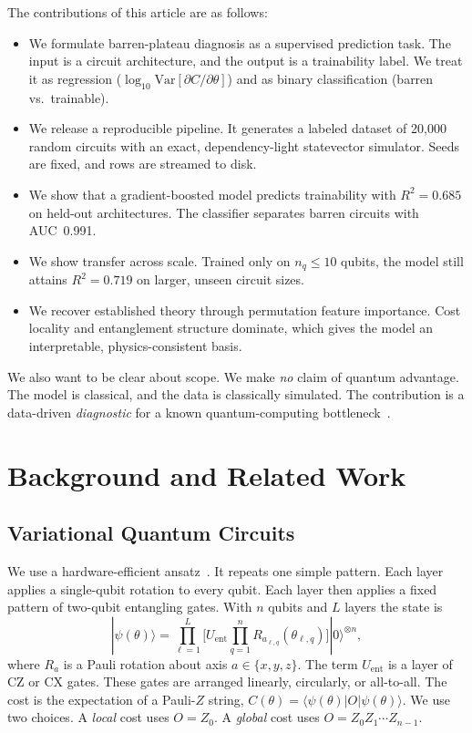 \documentclass[quantumrep,article,submit,pdftex,oneauthor]{Definitions/mdpi}
\newcommand{\Nrows}{20{,}000}
\newcommand{\RsqHold}{0.685}
\newcommand{\AucHold}{0.991}
\newcommand{\ExtrapCut}{10}
\newcommand{\RsqExtrap}{0.719}
\begin{document}
The contributions of this article are as follows:
\begin{itemize}
\item We formulate barren-plateau diagnosis as a supervised prediction task. The
input is a circuit architecture, and the output is a trainability label. We treat
it as regression ($\log_{10}\mathrm{Var}[\partial C/\partial\theta]$) and as
binary classification (barren vs.\ trainable).
\item We release a reproducible pipeline. It generates a labeled dataset of
\Nrows{} random circuits with an exact, dependency-light statevector simulator.
Seeds are fixed, and rows are streamed to disk.
\item We show that a gradient-boosted model predicts trainability with
$R^2=\RsqHold{}$ on held-out architectures. The classifier separates barren
circuits with AUC~\AucHold{}.
\item We show transfer across scale. Trained only on $n_q\le\ExtrapCut{}$ qubits,
the model still attains $R^2=\RsqExtrap{}$ on larger, unseen circuit sizes.
\item We recover established theory through permutation feature importance. Cost
locality and entanglement structure dominate, which gives the model an
interpretable, physics-consistent basis.
\end{itemize}

We also want to be clear about scope. We make \emph{no} claim of quantum
advantage. The model is classical, and the data is classically simulated. The
contribution is a data-driven \emph{diagnostic} for a known quantum-computing
bottleneck~\cite{schuld2022killoran,bowles2024benchmarking}.

\section{Background and Related Work}

\subsection{Variational Quantum Circuits}
We use a hardware-efficient ansatz~\cite{kandala2017hardware}. It repeats one
simple pattern. Each layer applies a single-qubit rotation to every qubit. Each
layer then applies a fixed pattern of two-qubit entangling gates. With $n$ qubits
and $L$ layers the state is
\begin{equation}
|\psi(\theta)\rangle = \prod_{\ell=1}^{L}
  \Big[ U_{\mathrm{ent}} \prod_{q=1}^{n} R_{a_{\ell,q}}(\theta_{\ell,q}) \Big]
  |0\rangle^{\otimes n},
\end{equation}
where $R_a$ is a Pauli rotation about axis $a\in\{x,y,z\}$. The term
$U_{\mathrm{ent}}$ is a layer of CZ or CX gates. These gates are arranged
linearly, circularly, or all-to-all. The cost is the expectation of a Pauli-$Z$
string, $C(\theta)=\langle\psi(\theta)|O|\psi(\theta)\rangle$. We use two
choices. A \emph{local} cost uses $O=Z_0$. A \emph{global} cost uses
$O=Z_0Z_1\cdots Z_{n-1}$.
\end{document}
